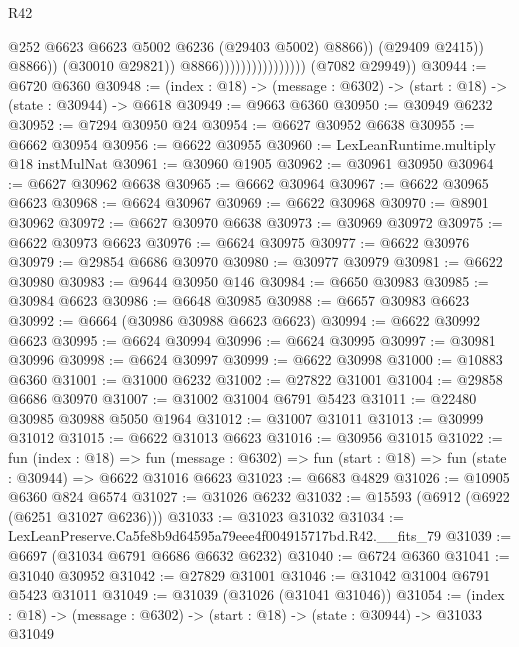 \begin{lexlean}{R42}
\begin{coremodule}
{                                                  @252
                                                  @6623
                                                  @6623
                                                  @5002
                                                  @6236
                                                  (@29403 @5002)
                                                  @8866))
                                              (@29409 @2415))
                                            @8866))
                                        (@30010 @29821))
                                      @8866))))))))))))))))
      (@7082 @29949))
@30944 := @6720 @6360
@30948 := (index : @18) -> (message : @6302) -> (start : @18) -> (state : @30944) -> @6618
@30949 := @9663 @6360
@30950 := @30949 @6232
@30952 := @7294 @30950 @24
@30954 := @6627 @30952 @6638
@30955 := @6662 @30954
@30956 := @6622 @30955
@30960 := LexLeanRuntime.multiply @18 instMulNat
@30961 := @30960 @1905
@30962 := @30961 @30950
@30964 := @6627 @30962 @6638
@30965 := @6662 @30964
@30967 := @6622 @30965 @6623
@30968 := @6624 @30967
@30969 := @6622 @30968
@30970 := @8901 @30962
@30972 := @6627 @30970 @6638
@30973 := @30969 @30972
@30975 := @6622 @30973 @6623
@30976 := @6624 @30975
@30977 := @6622 @30976
@30979 := @29854 @6686 @30970
@30980 := @30977 @30979
@30981 := @6622 @30980
@30983 := @9644 @30950 @146
@30984 := @6650 @30983
@30985 := @30984 @6623
@30986 := @6648 @30985
@30988 := @6657 @30983 @6623
@30992 := @6664 (@30986 @30988 @6623 @6623)
@30994 := @6622 @30992 @6623
@30995 := @6624 @30994
@30996 := @6624 @30995
@30997 := @30981 @30996
@30998 := @6624 @30997
@30999 := @6622 @30998
@31000 := @10883 @6360
@31001 := @31000 @6232
@31002 := @27822 @31001
@31004 := @29858 @6686 @30970
@31007 := @31002 @31004 @6791 @5423
@31011 := @22480 @30985 @30988 @5050 @1964
@31012 := @31007 @31011
@31013 := @30999 @31012
@31015 := @6622 @31013 @6623
@31016 := @30956 @31015
@31022 := fun (index : @18) =>
  fun (message : @6302) => fun (start : @18) => fun (state : @30944) => @6622 @31016 @6623
@31023 := @6683 @4829
@31026 := @10905 @6360 @824 @6574
@31027 := @31026 @6232
@31032 := @15593 (@6912 (@6922 (@6251 @31027 @6236)))
@31033 := @31023 @31032
@31034 := LexLeanPreserve.Ca5fe8b9d64595a79eee4f004915717bd.R42.__fits_79
@31039 := @6697 (@31034 @6791 @6686 @6632 @6232)
@31040 := @6724 @6360
@31041 := @31040 @30952
@31042 := @27829 @31001
@31046 := @31042 @31004 @6791 @5423 @31011
@31049 := @31039 (@31026 (@31041 @31046))
@31054 := (index : @18) -> (message : @6302) -> (start : @18) -> (state : @30944) -> @31033 @31049
}
\end{coremodule}
\end{lexlean}
